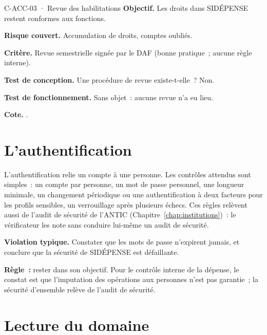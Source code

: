 \begin{boxobjet}{C-ACC-03 · Revue des habilitations}
\textbf{Objectif.} Les droits dans SIDÉPENSE restent conformes aux
fonctions.

\textbf{Risque couvert.} Accumulation de droits, comptes oubliés.

\textbf{Critère.} Revue semestrielle signée par le DAF (bonne pratique~;
aucune règle interne).

\textbf{Test de conception.} Une procédure de revue existe-t-elle~?
Non.

\textbf{Test de fonctionnement.} Sans objet~: aucune revue n'a eu lieu.

\textbf{Cote.} \NON{}.
\end{boxobjet}

\separateur

\section{L'authentification}
\label{sec:c09-authentification}

L'authentification relie un compte à une personne. Les contrôles attendus
sont simples~: un compte par personne, un mot de passe personnel, une
longueur minimale, un changement périodique ou une authentification à
deux facteurs pour les profils sensibles, un verrouillage après plusieurs
échecs. Ces règles relèvent aussi de l'audit de sécurité de l'ANTIC
(Chapitre~\ref{chap:institutions})~: le vérificateur les note sans
conduire lui-même un audit de sécurité.

\begin{boxalert}
\textbf{Violation typique.} Constater que les mots de passe n'expirent
jamais, et conclure que la sécurité de SIDÉPENSE est défaillante.

\smallskip
\textbf{Règle~:} rester dans son objectif. Pour le contrôle interne de la
dépense, le constat est que l'imputation des opérations aux personnes
n'est pas garantie~; la sécurité d'ensemble relève de l'audit de
sécurité.
\end{boxalert}

\separateur

\section{Lecture du domaine}
\label{sec:c09-lecture}

